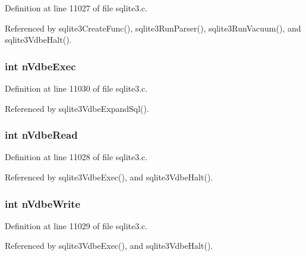 Definition at line 11027 of file sqlite3.\+c.



Referenced by sqlite3\+Create\+Func(), sqlite3\+Run\+Parser(), sqlite3\+Run\+Vacuum(), and sqlite3\+Vdbe\+Halt().

\hypertarget{structsqlite3_aa35753c4135ed2357c1052a174f28aa0}{}
\subsubsection[{n\+Vdbe\+Exec}]{\setlength{\rightskip}{0pt plus 5cm}int n\+Vdbe\+Exec}\label{structsqlite3_aa35753c4135ed2357c1052a174f28aa0}


Definition at line 11030 of file sqlite3.\+c.



Referenced by sqlite3\+Vdbe\+Expand\+Sql().

\hypertarget{structsqlite3_aec9833b30e0cc0116adeda7128c6824b}{}
\subsubsection[{n\+Vdbe\+Read}]{\setlength{\rightskip}{0pt plus 5cm}int n\+Vdbe\+Read}\label{structsqlite3_aec9833b30e0cc0116adeda7128c6824b}


Definition at line 11028 of file sqlite3.\+c.



Referenced by sqlite3\+Vdbe\+Exec(), and sqlite3\+Vdbe\+Halt().

\hypertarget{structsqlite3_ac51e5e0b6558c0f8d5e7dc89abf728a6}{}
\subsubsection[{n\+Vdbe\+Write}]{\setlength{\rightskip}{0pt plus 5cm}int n\+Vdbe\+Write}\label{structsqlite3_ac51e5e0b6558c0f8d5e7dc89abf728a6}


Definition at line 11029 of file sqlite3.\+c.



Referenced by sqlite3\+Vdbe\+Exec(), and sqlite3\+Vdbe\+Halt().

\hypertarget{structsqlite3_ac9a2a893dae0aec6a1db1311a095bcb8}{}
